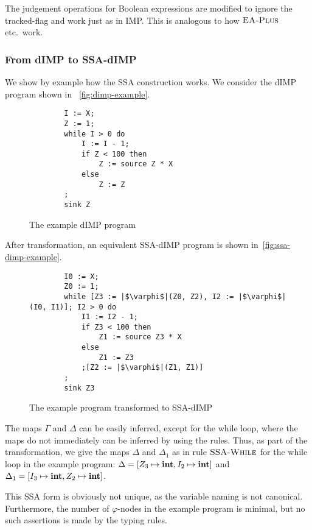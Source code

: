 The judgement operations for Boolean expressions are modified to ignore the tracked-flag and work
just as in IMP. This is analogous to how $\textsc{EA-Plus}$ etc.\ work.

\subsubsection*{From dIMP to SSA-dIMP}
We show by example how the SSA construction works.
We consider the dIMP program shown in ~\autoref{fig:dimp-example}.
\begin{figure}[h]
    \begin{verbatim}
        I := X;
        Z := 1;
        while I > 0 do
            I := I - 1;
            if Z < 100 then
                Z := source Z * X
            else
                Z := Z
        ;
        sink Z
    \end{verbatim}    
    \caption{The example dIMP program}
    \label{fig:dimp-example}
\end{figure}
After transformation, an equivalent SSA-dIMP program is shown in~\autoref{fig:ssa-dimp-example}.

\begin{figure}[h]
    \begin{verbatim}
        I0 := X;
        Z0 := 1;
        while [Z3 := |$\varphi$|(Z0, Z2), I2 := |$\varphi$|(I0, I1)]; I2 > 0 do
            I1 := I2 - 1;
            if Z3 < 100 then
                Z1 := source Z3 * X
            else
                Z1 := Z3
            ;[Z2 := |$\varphi$|(Z1, Z1)]
        ;
        sink Z3
    \end{verbatim}    
    \caption{The example program transformed to SSA-dIMP}
    \label{fig:ssa-dimp-example}
\end{figure}
The maps $\Gamma$ and $\Delta$ can be easily inferred, except for the while loop,
where the maps do not immediately can be inferred by using the rules.
Thus, as part of the transformation, we give the maps $\Delta$ and 
$\Delta_1$ as in rule $\textsc{SSA-While}$ for the while loop in the example program:
$\Delta = [Z_3 \mapsto \textbf{int}, I_2 \mapsto \textbf{int}]$ and $\Delta_1 = [I_3 \mapsto \textbf{int}, Z_2 \mapsto \textbf{int}]$.

This SSA form is obviously not unique, as the variable naming is not canonical.
Furthermore, the number of $\varphi$-nodes in the example program is minimal,
but no such assertions is made by the typing rules.

